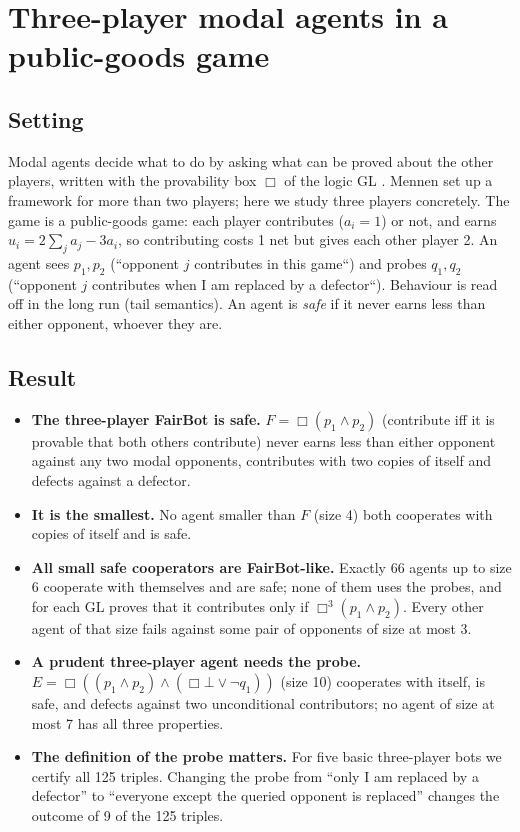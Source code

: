 \documentclass{article}
\begin{document}
\section{Three-player modal agents in a public-goods game}
\label{sec:three-player-modal-agents}

\subsection*{Setting}

Modal agents decide what to do by asking what can be proved about the other players, written with
the provability box $\Box$ of the logic GL \cite{barasz2014robust}. Mennen \cite{mennen2017modal} set up a
framework for more than two players; here we study three players concretely. The game is a
public-goods game: each player contributes ($a_i = 1$) or not, and earns
$u_i = 2\sum_j a_j - 3a_i$, so contributing costs 1 net but gives each other player 2. An agent sees
$p_1, p_2$ (``opponent $j$ contributes in this game``) and probes $q_1, q_2$ (``opponent $j$
contributes when I am replaced by a defector``). Behaviour is read off in the long run (tail
semantics). An agent is \emph{safe} if it never earns less than either opponent, whoever they are.

\subsection*{Result}

\begin{itemize}
\item \textbf{The three-player FairBot is safe.} $F = \Box(p_1 \wedge p_2)$ (contribute iff it is provable that both others contribute) never earns less than either opponent against any two modal opponents, contributes with two copies of itself and defects against a defector.
\item \textbf{It is the smallest.} No agent smaller than $F$ (size 4) both cooperates with copies of itself and is safe.
\item \textbf{All small safe cooperators are FairBot-like.} Exactly 66 agents up to size 6 cooperate with themselves and are safe; none of them uses the probes, and for each GL proves that it contributes only if $\Box^3(p_1 \wedge p_2)$. Every other agent of that size fails against some pair of opponents of size at most 3.
\item \textbf{A prudent three-player agent needs the probe.} $E = \Box((p_1 \wedge p_2) \wedge (\Box\bot \vee \neg q_1))$ (size 10) cooperates with itself, is safe, and defects against two unconditional contributors; no agent of size at most 7 has all three properties.
\item \textbf{The definition of the probe matters.} For five basic three-player bots we certify all 125 triples. Changing the probe from ``only I am replaced by a defector'' to ``everyone except the queried opponent is replaced'' changes the outcome of 9 of the 125 triples.
\end{itemize}
\end{document}
